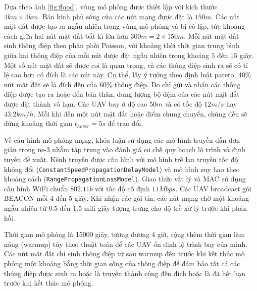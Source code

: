 \documentclass[a4paper]{article}
\begin{document}
Dựa theo ảnh \ref{fig:flood}, vùng mô phỏng được thiết lập với kích thước $4km \times 4km$. Bán kính phủ sóng của các nút mạng được đặt là $150m$. 
Các nút mặt đất được tạo ra ngẫu nhiên trong vùng mô phỏng và bị cô lập, tức khoảng cách giữa hai nút mặt đất bất kì lớn hơn $300m = 2 \times 150m$. Mỗi nút mặt đất sinh thông điệp theo phân phối Poisson, với khoảng thời thời gian trung bình giữa hai thông điệp của mỗi nút được đặt ngẫu nhiên trong khoảng $5$ đến $15$ giây. Một số nút mặt đất sẽ được coi là quan trọng, và các thông điệp sinh ra sẽ có tỉ lệ cao hơn có đích là các nút này. Cụ thể, lấy ý tưởng theo định luật pareto, 40\% nút mặt đất sẽ là đích đến của 60\% thông điệp.
Do chỉ gửi và nhận các thông điệp được tạo ra hoặc đến bản thân, dung lượng bộ đệm của các nút mặt đất được đặt thành vô hạn. 
Các UAV bay ở độ cao $50m$ và có tốc độ $12m/s$ hay $43.2km/h$. Mỗi khi đến một nút mặt đất hoặc điểm chung chuyển, chúng đều sẽ dừng khoảng thời gian $t_{hover} = 5s$ để trao đổi.

Về cấu hình mô phỏng mạng, khóa luận sử dụng các mô hình truyền dẫn đơn giản trong ns-3 nhằm tập trung vào đánh giá cơ chế quy hoạch lộ trình và định tuyến đề xuất. Kênh truyền được cấu hình với mô hình trễ lan truyền tốc độ không đổi (\texttt{ConstantSpeedPropagationDelayModel}) và mô hình suy hao theo khoảng cách (\texttt{RangePropagationLossModel}). Giao thức vật lý và MAC sử dụng cấu hình WiFi chuẩn $802.11b$ với tốc độ cố định $11Mbps$. Các UAV broadcast gói BEACON mỗi 4 đến 5 giây. Khi nhận các gói tin, các nút mạng chờ một khoảng ngẫu nhiên từ 0.5 đến 1.5 mili giây tượng trưng cho độ trễ xử lý trước khi phản hồi.

Thời gian mô phỏng là 15000 giây, tương đương 4 giờ, cộng thêm thời gian làm nóng (warmup) tùy theo thuật toán để các UAV ổn định lộ trình bay của mình. Các nút mặt đất chỉ sinh thông điệp từ sau warmup đến trước khi kết thúc mô phỏng một khoảng bằng thời gian sống của thông điệp để đảm bảo tất cả các thông điệp được sinh ra hoặc là truyền thành công đến đích hoặc là đã hết hạn trước khi kết thúc mô phỏng. 
\end{document}
